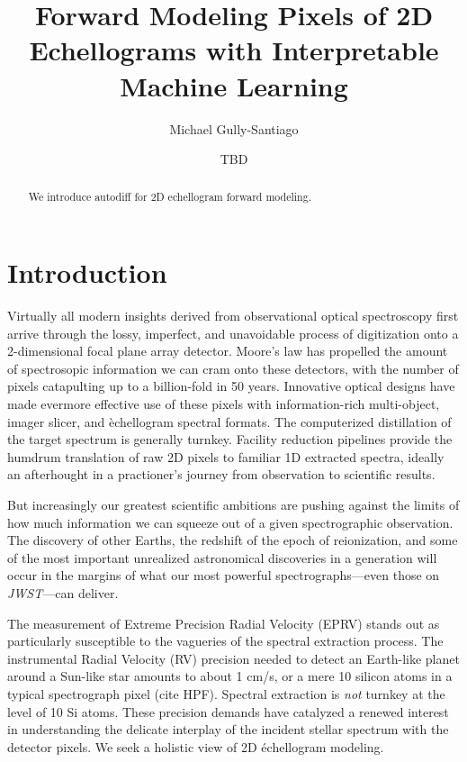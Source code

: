 \documentclass[twocolumn]{aastex63}
\begin{document}
\title{Forward Modeling Pixels of 2D Echellograms with Interpretable Machine Learning}

\author{Michael Gully-Santiago}

\author{TBD}


\begin{abstract}

  We introduce autodiff for 2D echellogram forward modeling.

\end{abstract}



\section{Introduction}\label{sec:intro}

Virtually all modern insights derived from observational optical spectroscopy first arrive through the lossy, imperfect, and unavoidable process of digitization onto a 2-dimensional focal plane array detector.  Moore's law has propelled the amount of spectrosopic information we can cram onto these detectors, with the number of pixels catapulting up to a billion-fold in 50 years.  Innovative optical designs have made evermore effective use of these pixels with information-rich multi-object, imager slicer, and \`echellogram spectral formats.  The computerized distillation of the target spectrum is generally turnkey.  Facility reduction pipelines provide the humdrum translation of raw 2D pixels to familiar 1D extracted spectra, ideally an afterhought in a practioner's journey from observation to scientific results.

But increasingly our greatest scientific ambitions are pushing against the limits of how much information we can squeeze out of a given spectrographic observation.  The discovery of other Earths, the redshift of the epoch of reionization, and some of the most important unrealized astronomical discoveries in a generation will occur in the margins of what our most powerful spectrographs---even those on \emph{JWST}---can deliver.

The measurement of Extreme Precision Radial Velocity (EPRV) stands out as particularly susceptible to the vagueries of the spectral extraction process.  The instrumental Radial Velocity (RV) precision needed to detect an Earth-like planet around a Sun-like star amounts to about 1 cm/s, or a mere 10 silicon atoms in a typical spectrograph pixel (cite HPF).  Spectral extraction is \emph{not} turnkey at the level of 10 Si atoms.  These precision demands have catalyzed a renewed interest in understanding the delicate interplay of the incident stellar spectrum with the detector pixels.  We seek a holistic view of 2D \'echellogram modeling.
\end{document}
